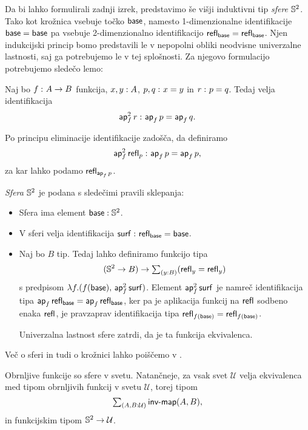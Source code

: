 Da bi lahko formulirali zadnji izrek, predstavimo še višji induktivni tip \emph{sfere} \(\mathbb{S}^{2}\). Tako kot krožnica vsebuje točko \(\textnormal{\textsf{base}}\), namesto 1-dimenzionalne identifikacije \(\textnormal{\textsf{base}} = \textnormal{\textsf{base}}\) pa vsebuje 2-dimenzionalno identifikacijo \(\textnormal{\textsf{refl}}_{\textnormal{\textsf{base}}} = \textnormal{\textsf{refl}}_{\textnormal{\textsf{base}}}\). Njen indukcijski princip bomo predstavili le v nepopolni obliki neodvisne univerzalne lastnosti, saj ga potrebujemo le v tej splošnosti. Za njegovo formulacijo potrebujemo sledečo lemo:

\begin{lema}
  Naj bo \(f \,\colon A \to B\) funkcija, \(x, y : A\), \(p, q \,\colon x = y\) in \(r \,\colon p = q\). Tedaj velja identifikacija
  \[\textnormal{\textsf{ap}}_{f}^{2}\,r \,\colon \textnormal{\textsf{ap}}_{f}\,p = \textnormal{\textsf{ap}}_{f}\,q.\]
\end{lema}

\begin{dokaz}
  Po principu eliminacije identifikacije zadošča, da definiramo
  \[\textnormal{\textsf{ap}}_{f}^{2}\,\textnormal{\textsf{refl}}_{p} \,\colon \textnormal{\textsf{ap}}_{f}\,p = \textnormal{\textsf{ap}}_{f}\,p,\] za kar lahko podamo
  \(\textnormal{\textsf{refl}}_{\textnormal{\textsf{ap}}_{f}\,p}\).
\end{dokaz}

\begin{definicija}
  \emph{Sfera} \(\mathbb{S}^{2}\) je podana s sledečimi pravili sklepanja:
  \begin{itemize}
  \item Sfera ima element \(\textnormal{\textsf{base}} : \mathbb{S}^{2}\).
  \item V sferi velja identifikacija \(\textnormal{\textsf{surf}} \,\colon \textnormal{\textsf{refl}}_{\textnormal{\textsf{base}}} = \textnormal{\textsf{base}}\).
  \item Naj bo \(B\) tip. Tedaj lahko definiramo funkcijo tipa
    \[(\mathbb{S}^{2} \to B) \to \textstyle \sum_{\left( y : B \right)} (\textnormal{\textsf{refl}}_{y} = \textnormal{\textsf{refl}}_{y})\]
    s predpisom \(\lambda f. (f(\textnormal{\textsf{base}}),\, \textnormal{\textsf{ap}}_{f}^{2}\,\textnormal{\textsf{surf}})\). Element \(\textnormal{\textsf{ap}}_{f}^{2}\,\textnormal{\textsf{surf}}\) je namreč identifikacija tipa
    \(\textnormal{\textsf{ap}}_{f}\,\textnormal{\textsf{refl}}_{\textnormal{\textsf{base}}} = \textnormal{\textsf{ap}}_{f}\,\textnormal{\textsf{refl}}_{\textnormal{\textsf{base}}}\), ker pa je aplikacija funkcij na \(\textnormal{\textsf{refl}}_{}\) sodbeno enaka \(\textnormal{\textsf{refl}}_{}\), je pravzaprav identifikacija tipa
    \(\textnormal{\textsf{refl}}_{f(\textnormal{\textsf{base}})} = \textnormal{\textsf{refl}}_{f(\textnormal{\textsf{base}})}\).

    Univerzalna lastnost sfere zatrdi, da je ta funkcija ekvivalenca.
  \end{itemize}
\end{definicija}

Več o sferi in tudi o krožnici lahko poiščemo v \cite[Poglavje II.6.4]{hottbook}.

\begin{izrek}
  Obrnljive funkcije so sfere v svetu. Natančneje, za vsak svet \(\mathcal{U}\) velja ekvivalenca med tipom obrnljivih funkcij v svetu \(\mathcal{U}\), torej tipom \[{\textstyle \sum_{\left( A, B : \mathcal{U} \right)} \textnormal{\textsf{inv-map}}(A, B)},\] in funkcijskim tipom \(\mathbb{S}^{2} \to \mathcal{U}\).
\end{izrek}

